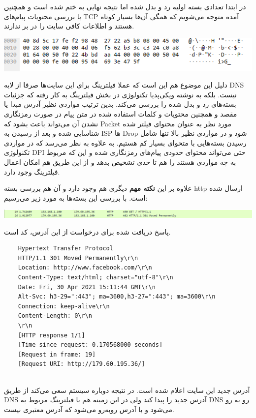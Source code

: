 \documentclass[12pt]{article}
\begin{document}
\begin{enumerate}
در ابتدا تعدادی بسته اولیه رد و بدل شده اما نتیجه نهایی به  ختم شده است و همچنین با بررسی محتویات پیام‌های TCP آمده متوجه می‌شویم که همگی آن‌ها بسیار کوتاه هستند و اطلاعات کافی سایت را در بر ندارند.


\begin{center}
	\includegraphics[width = 0.5 \textwidth]{images/9.png}
\end{center}

دلیل این موضوع هم این است که عملا فیلترینگ برای این سایت‌ها صرفا از لایه DNS نیست. بلکه به نوشته ویکی‌پدیا تکنولوژی  در بخش فیلترینگ به کار رفته که جزئیات بسته‌های رد و بدل شده را بررسی می‌کند. بدین ترتیب مواردی نظیر آدرس مبدا یا مقصد و همچنین محتویات و کلمات استفاده شده در متن پیام در صورت رمزنگاری نشدن آن می‌تواند باعث بشود که Packet مورد نظر به عنوان محتوای فیلتر شده شناسایی شده و بعد از رسیدن به ISP ها Drop شود و در مواردی نظیر بالا تنها شامل رسیدن بسته‌هایی با متحوای بسیار کم هستیم. به علاوه به نظر می‌رسد که در مواردی تکنولوژی DPI حتی می‌تواند محتوای حدودی پیام‌های رمزنگاری شده و این که مربوط به چه مواردی هستند را هم تا حدی تشخیص بدهد و از این طریق هم امکان اعمال فیلترینگ وجود دارد.

علاوه بر این \textbf{نکته مهم} دیگری هم وجود دارد و آن هم بررسی بسته http ارسال شده است. با بررسی این بسته‌ها به مورد زیر می‌رسیم:

\begin{center}
	\includegraphics[width = 0.5 \textwidth]{images/10.png}
\end{center}

پاسخ دریافت شده برای درخواست  از این آدرس، کد  است.


\begin{latin}
	\begin{verbatim}
	Hypertext Transfer Protocol
	HTTP/1.1 301 Moved Permanently\r\n
	Location: http://www.facebook.com/\r\n
	Content-Type: text/html; charset="utf-8"\r\n
	Date: Fri, 30 Apr 2021 15:11:44 GMT\r\n
	Alt-Svc: h3-29=":443"; ma=3600,h3-27=":443"; ma=3600\r\n
	Connection: keep-alive\r\n
	Content-Length: 0\r\n
	\r\n
	[HTTP response 1/1]
	[Time since request: 0.170568000 seconds]
	[Request in frame: 19]
	[Request URI: http://179.60.195.36/]
		
	\end{verbatim}
\end{latin}

آدرس جدید این سایت  اعلام شده است. در نتیجه دوباره سیستم سعی‌ می‌کند از طریق DNS آدرس جدید را پیدا کند ولی در این زمینه هم با فیلترینگ مربوط به DNS رو به رو می‌شود و با آدرس  رو‌به‌رو می‌شود که آدرس معتبری نیست.

	
\end{enumerate}
\end{document}
